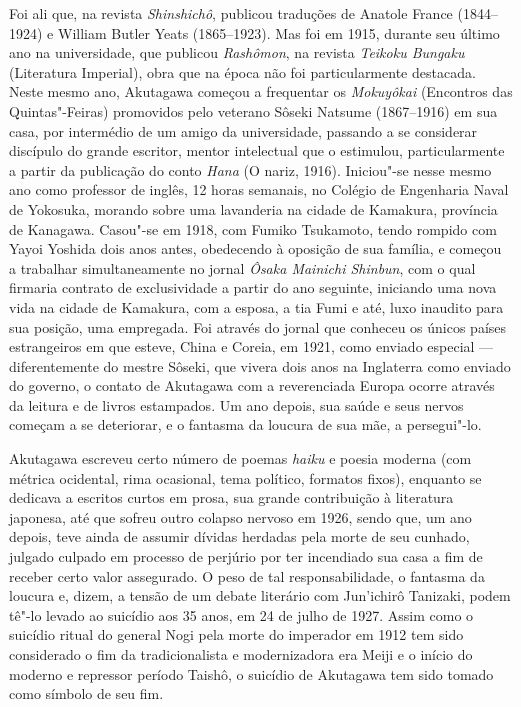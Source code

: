 Foi ali que, na revista \textit{Shinshichô}, publicou traduções de
Anatole France (1844--1924) e William Butler Yeats (1865--1923).
Mas foi em 1915, durante seu último ano na universidade, que publicou
\textit{Rashômon}, na revista \textit{Teikoku Bungaku}
(Literatura Imperial), obra que na época não foi particularmente
destacada. Neste mesmo ano, Akutagawa começou a frequentar os 
\textit{Mokuyôkai} (Encontros das Quintas"-Feiras) promovidos pelo
veterano  Sôseki Natsume (1867--1916) em sua casa, por intermédio de um
amigo da universidade, passando a se considerar discípulo do grande
escritor, mentor intelectual que o estimulou, particularmente a partir
da publicação do conto \textit{Hana} (O nariz, 1916). Iniciou"-se nesse
mesmo ano como professor de inglês, 12 horas semanais, no Colégio de
Engenharia Naval de Yokosuka, morando sobre uma lavanderia na cidade de
Kamakura, província de Kanagawa. Casou"-se em 1918, com Fumiko
Tsukamoto, tendo rompido com Yayoi Yoshida dois anos antes, obedecendo
à oposição de sua família, e começou a trabalhar simultaneamente no
jornal \textit{Ôsaka Mainichi Shinbun}, com o qual firmaria contrato de
exclusividade a partir do ano seguinte, iniciando uma nova vida na
cidade de Kamakura, com a esposa, a tia Fumi e até, luxo inaudito para
sua posição, uma empregada. Foi através do jornal que conheceu os
únicos países estrangeiros em que esteve, China e Coreia, em 1921, como
enviado especial --- diferentemente do mestre Sôseki, que vivera dois
anos na Inglaterra como enviado do governo, o contato de Akutagawa com
a reverenciada Europa ocorre através da leitura e de livros estampados.
Um ano depois, sua saúde e seus nervos começam a se deteriorar, e o
fantasma da loucura de sua mãe, a persegui"-lo.

Akutagawa escreveu certo número de poemas \textit{haiku} e 
poesia moderna (com métrica ocidental, rima ocasional, tema político,
formatos fixos), enquanto se dedicava a escritos curtos em prosa, sua
grande contribuição à literatura japonesa, até que sofreu outro colapso
nervoso em 1926, sendo que, um ano depois, teve ainda de assumir
dívidas herdadas pela morte de seu cunhado, julgado culpado em processo
de perjúrio por ter incendiado sua casa a fim de receber certo valor
assegurado. O peso de tal responsabilidade, o fantasma da loucura e,
dizem, a tensão de um debate literário com Jun'ichirô Tanizaki, podem
tê"-lo levado ao suicídio aos 35 anos, em 24 de julho de 1927. Assim
como o suicídio ritual do general Nogi pela morte do imperador em 1912
tem sido considerado o fim da tradicionalista e modernizadora era Meiji
e o início do moderno e repressor período Taishô, o suicídio de
Akutagawa tem sido tomado como símbolo de seu fim.

